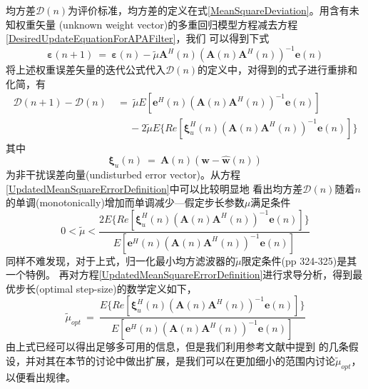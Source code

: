 均方差$\mathscr{D}(n)$为评价标准，均方差的定义在式\eqref{MeanSquareDeviation}。用含有未知权重矢量
(unknown weight vector)的多重回归模型方程减去方程\eqref{DesiredUpdateEquationForAPAFilter}，我们
可以得到下式
\begin{equation}%
    \boldsymbol{\varepsilon}(n+1)~=~\boldsymbol{\varepsilon}(n)-
    \tilde{\mu}\mathbf{A}^{H}(n)(\mathbf{A}(n)\mathbf{A}^{H}(n))^{-1}
    \mathbf{e}(n)
\end{equation}
将上述权重误差矢量的迭代公式代入$\mathscr{D}(n)$的定义中，对得到的式子进行重排和化简，有
\begin{equation}
\label{UpdatedMeanSquareErrorDefinition}
\begin{split}
\mathscr{D}(n+1)-\mathscr{D}(n) & ~=~ \tilde{\mu}E[\mathbf{e}^{H}(n)(\mathbf{A}(n)\mathbf{A}^{H}(n))^{-1}\mathbf{e}(n)]\\
& \quad~~-2\tilde{\mu}E\{Re[\boldsymbol{\xi}^{H}_{u}(n)(\mathbf{A}(n)\mathbf{A}^{H}(n))^{-1}\mathbf{e}(n)]\}
\end{split}
\end{equation}
其中
\begin{equation}
    \boldsymbol{\xi}_{u}(n)~=~\mathbf{A}(n)(\mathbf{w}-\hat{\mathbf{w}}(n))
\end{equation}
为非干扰误差向量(undisturbed error vector)。从方程\eqref{UpdatedMeanSquareErrorDefinition}中可以比较明显地
看出均方差$\mathscr{D}(n)$随着$n$的单调(monotonically)增加而单调减少---假定步长参数$\mu$满足条件
\begin{equation}
\label{}
    0 < \tilde{\mu} < \frac{2E\{Re[\boldsymbol{\xi}^{H}_{u}(n)(\mathbf{A}(n)\mathbf{A}^{H}(n))^{-1}\mathbf{e}(n)]\}}
    {E[\mathbf{e}^{H}(n)(\mathbf{A}(n)\mathbf{A}^{H}(n))^{-1}\mathbf{e}(n)]}
\end{equation}
同样不难发现，对于上式，归一化最小均方滤波器的$\tilde{\mu}$限定条件(pp 324-325)是其一个特例。
再对方程\eqref{UpdatedMeanSquareErrorDefinition}进行求导分析，得到最优步长(optimal step-size)的数学定义如下，
\begin{equation}
\label{AffineProjectionAdaptiveFilterOptimalStepSize}
    \tilde{\mu}_{opt}~=~\frac{E\{Re[\boldsymbol{\xi}^{H}_{u}(n)(\mathbf{A}(n)\mathbf{A}^{H}(n))^{-1}\mathbf{e}(n)]\}}
    {E[\mathbf{e}^{H}(n)(\mathbf{A}(n)\mathbf{A}^{H}(n))^{-1}\mathbf{e}(n)]}
\end{equation}
由上式已经可以得出足够多可用的信息，但是我们利用参考文献中提到
的几条假设，并对其在本节的讨论中做出扩展，是我们可以在更加细小的范围内讨论$\tilde{\mu}_{opt}$，以便看出规律。
